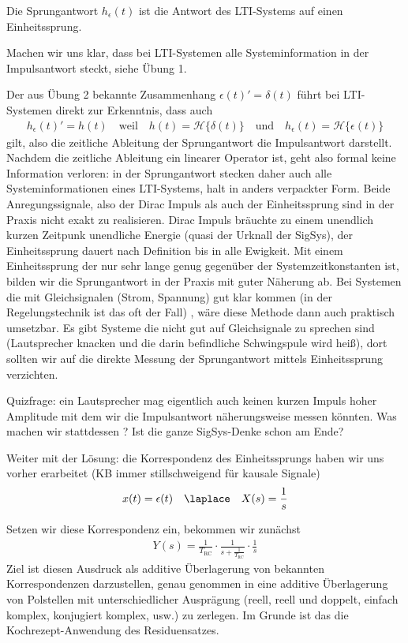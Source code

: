 \begin{Loesung}
\begin{itemize}
Die Sprungantwort $h_\epsilon(t)$ ist die Antwort des LTI-Systems auf einen Einheitssprung.

Machen wir uns klar, dass bei LTI-Systemen alle Systeminformation in der Impulsantwort
steckt, siehe Übung 1.

Der aus Übung 2 bekannte Zusammenhang $\epsilon(t)' = \delta(t)$ führt bei LTI-Systemen
direkt zur Erkenntnis, dass auch
\begin{eqnarray}
h_\epsilon(t)' = h(t)\quad\text{weil}\quad
h(t)=\mathcal{H}\{\delta(t)\}
\quad\text{und}\quad
h_\epsilon(t)=\mathcal{H}\{\epsilon(t)\}
\end{eqnarray}
gilt, also die zeitliche Ableitung der Sprungantwort die Impulsantwort darstellt.
%
Nachdem die zeitliche Ableitung ein linearer Operator ist, geht also formal keine
Information verloren: in der Sprungantwort stecken daher auch alle Systeminformationen
eines LTI-Systems, halt in anders verpackter Form.
%
Beide Anregungssignale, also der Dirac Impuls als auch der Einheitssprung sind in
der Praxis nicht exakt zu realisieren. Dirac Impuls bräuchte zu einem unendlich kurzen
Zeitpunk unendliche Energie (quasi der Urknall der SigSys), der Einheitssprung
dauert nach Definition bis in alle Ewigkeit.
%
Mit einem Einheitssprung der nur sehr lange genug gegenüber der Systemzeitkonstanten
ist, bilden wir die Sprungantwort in der Praxis mit guter Näherung ab.
%
Bei Systemen die mit Gleichsignalen
(Strom, Spannung) gut klar kommen
(in der Regelungstechnik ist das oft der Fall)
, wäre diese Methode dann auch praktisch umsetzbar.
%
Es gibt Systeme die nicht gut auf Gleichsignale zu sprechen sind (Lautsprecher
knacken und die darin befindliche Schwingspule wird heiß),
dort sollten wir auf die direkte Messung der Sprungantwort mittels
Einheitssprung verzichten.
%

Quizfrage: ein Lautsprecher mag eigentlich auch keinen kurzen Impuls hoher Amplitude
mit dem wir die Impulsantwort näherungsweise messen könnten. Was machen wir stattdessen
? Ist die ganze SigSys-Denke schon am Ende?


Weiter mit der Lösung: die Korrespondenz des Einheitssprungs
haben wir uns vorher erarbeitet (KB immer stillschweigend für kausale Signale)
\begin{equation}
x(t)=\epsilon(t) \quad \laplace \quad X(s)=\frac{1}{s}
\end{equation}

Setzen wir diese Korrespondenz ein, bekommen wir zunächst
\begin{align}
Y(s) = \frac{1}{T_\mathrm{RC}}\cdot\frac{1}{s + \frac{1}{T_\mathrm{RC}}} \cdot \frac{1}{s}
\end{align}
Ziel ist diesen Ausdruck als additive Überlagerung von bekannten Korrespondenzen
darzustellen, genau genommen in eine additive Überlagerung von Polstellen mit
unterschiedlicher Ausprägung
(reell, reell und doppelt, einfach komplex, konjugiert komplex, usw.) zu zerlegen.
Im Grunde ist das die Kochrezept-Anwendung des Residuensatzes.


\end{itemize}
\end{Loesung}
